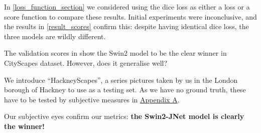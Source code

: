 In \cref{loss_function_section} we considered using the dice loss as either a loss or a score function to compare these results.
Initial experiments were inconclusive, and the results in \cref{result_scores} confirm this: despite having identical dice loss, the three models are wildly different.

The validation scores in \label{result_scores} show the Swin2 model to be the clear winner in CityScapes dataset.
However, does it generalise well?

We introduce ``HackneyScapes'', a series pictures taken by us in the London borough of Hackney to use as a testing set.
As we have no ground truth, these have to be tested by subjective measures in \hyperref[hackneyscapes]{Appendix A}.

Our subjective eyes confirm our metrics: \textbf{the Swin2-JNet model is clearly the winner!}
